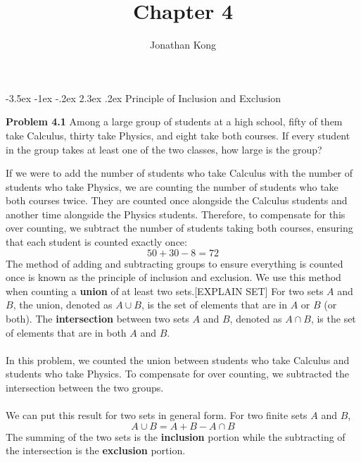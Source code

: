 \documentclass[11pt]{scrartcl}
\title{\normalfont\notesize\textbf{Chapter 4}}
\author{Jonathan Kong}
\date{}
\makeatletter
\renewcommand\section{\@startsection{section}{1}{\z@}%
                                   {-3.5ex \@plus -1ex \@minus -.2ex}%
                                   {2.3ex \@plus.2ex}%
                                   {\normalfont\large\bfseries}}
\makeatother
\begin{document}
\maketitle
\section{Principle of Inclusion and Exclusion}
\begin{tcolorbox}
\textbf{Problem 4.1} Among a large group of students at a high school, fifty of them take Calculus, thirty take Physics, and eight take both courses. If every student in the group takes at least one of the two classes, how large is the group? 
\end{tcolorbox}
\noindent 
If we were to add the number of students who take Calculus with the number of students who take Physics, we are counting the number of students who take both courses twice. They are counted once alongside the Calculus students and another time alongside the Physics students. Therefore, to compensate for this over counting, we subtract the number of students taking both courses, ensuring that each student is counted exactly once: 
$$50+30-8=72$$
The method of adding and subtracting groups to ensure everything is counted once is known as the principle of inclusion and exclusion. We use this method when counting a \textbf{union} of at least two sets.[EXPLAIN SET] For two sets $A$ and $B$, the union, denoted as $A \cup B$, is the set of elements that are in $A$ or $B$ (or both). The \textbf{intersection} between two sets $A$ and $B$, denoted as $A \cap B$, is the set of elements that are in both $A$ and $B$. \\
\\
\noindent 
In this problem, we counted the union between students who take Calculus and students who take Physics. To compensate for over counting, we subtracted the intersection between the two groups. \\
\\
\noindent
We can put this result for two sets in general form. For two finite sets $A$ and $B$, 
$${A \cup B}=A+B-{A \cap B}$$
 The summing of the two sets is the \textbf{inclusion} portion while the subtracting of the intersection is the \textbf{exclusion} portion.\\
\\
\end{document}
